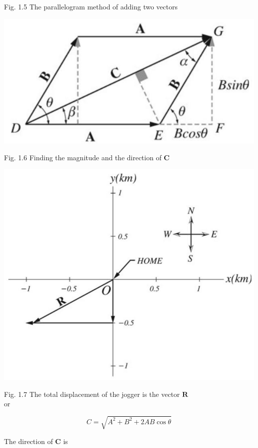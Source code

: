 \documentclass[10pt]{article}
\begin{document}
Fig. 1.5 The parallelogram method of adding two vectors

\begin{center}
\includegraphics[max width=\textwidth]{2024_09_13_db1f357d2aad0a03eb2eg-015(2)}
\end{center}

Fig. 1.6 Finding the magnitude and the direction of $\mathbf{C}$

\begin{center}
\includegraphics[max width=\textwidth]{2024_09_13_db1f357d2aad0a03eb2eg-015(4)}
\end{center}

Fig. 1.7 The total displacement of the jogger is the vector $\mathbf{R}$\\
or

$$
C=\sqrt{A^{2}+B^{2}+2 A B \cos \theta}
$$

The direction of $\mathbf{C}$ is
\end{document}

